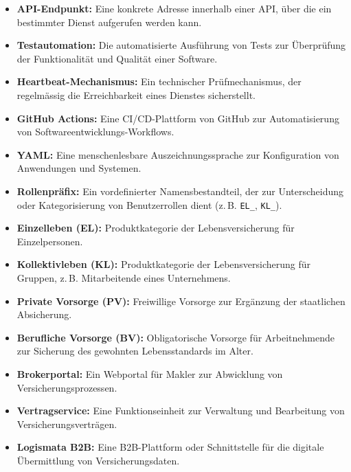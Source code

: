 \begin{itemize}
  \item \textbf{API-Endpunkt:} Eine konkrete Adresse innerhalb einer API, über die ein bestimmter Dienst aufgerufen werden kann.

  \item \textbf{Testautomation:} Die automatisierte Ausführung von Tests zur Überprüfung der Funktionalität und Qualität einer Software.

  \item \textbf{Heartbeat-Mechanismus:} Ein technischer Prüfmechanismus, der regelmässig die Erreichbarkeit eines Dienstes sicherstellt.

  \item \textbf{GitHub Actions:} Eine CI/CD-Plattform von GitHub zur Automatisierung von Softwareentwicklungs-Workflows.

  \item \textbf{YAML:} Eine menschenlesbare Auszeichnungssprache zur Konfiguration von Anwendungen und Systemen.

  \item \textbf{Rollenpräfix:} Ein vordefinierter Namensbestandteil, der zur Unterscheidung oder Kategorisierung von Benutzerrollen dient (z.\,B. \texttt{EL\_}, \texttt{KL\_}).

  \item \textbf{Einzelleben (EL):} Produktkategorie der Lebensversicherung für Einzelpersonen.

  \item \textbf{Kollektivleben (KL):} Produktkategorie der Lebensversicherung für Gruppen, z.\,B. Mitarbeitende eines Unternehmens.

  \item \textbf{Private Vorsorge (PV):} Freiwillige Vorsorge zur Ergänzung der staatlichen Absicherung.

  \item \textbf{Berufliche Vorsorge (BV):} Obligatorische Vorsorge für Arbeitnehmende zur Sicherung des gewohnten Lebensstandards im Alter.

  \item \textbf{Brokerportal:} Ein Webportal für Makler zur Abwicklung von Versicherungsprozessen.

  \item \textbf{Vertragservice:} Eine Funktionseinheit zur Verwaltung und Bearbeitung von Versicherungsverträgen.

  \item \textbf{Logismata B2B:} Eine B2B-Plattform oder Schnittstelle für die digitale Übermittlung von Versicherungsdaten.


\end{itemize}
